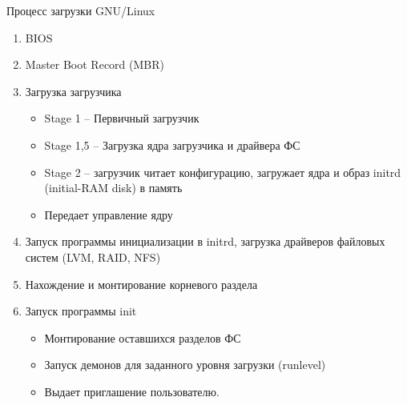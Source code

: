 \begin{frame}{Процесс загрузки GNU/Linux}
	\scriptsize
	\begin{enumerate}
		\item BIOS
		\item Master Boot Record (MBR)
			\pause
		\item Загрузка загрузчика 
		\begin{itemize}
		\footnotesize
			\item Stage 1 -- Первичный загрузчик
			\item Stage 1,5 -- Загрузка ядра загрузчика и драйвера ФС
			\item Stage 2 -- загрузчик читает конфигурацию, загружает ядра и образ initrd (initial-RAM disk) в память
                        \item Передает управление ядру
		\end{itemize}

		\item Запуск программы инициализации в initrd, загрузка драйверов файловых систем (LVM, RAID, NFS)
			\pause
		\item Нахождение и монтирование корневого раздела
			\pause
		\item Запуск программы init
		\begin{itemize}
		\footnotesize
			\item Монтирование оставшихся разделов ФС
			\item Запуск демонов для заданного уровня загрузки (runlevel)
			\item Выдает приглашение пользователю. 
		\end{itemize}

	\end{enumerate}
\end{frame}
